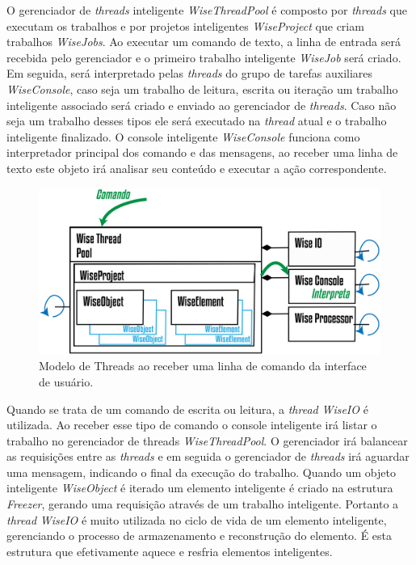 O gerenciador de \textit{threads} inteligente \textit{WiseThreadPool} é composto por \textit{threads} que executam os trabalhos e por projetos inteligentes \textit{WiseProject} que criam trabalhos \textit{WiseJobs}. Ao executar um comando de texto, a linha de entrada será recebida pelo gerenciador e o primeiro trabalho inteligente \textit{WiseJob} será criado. Em seguida, será interpretado pelas \textit{threads} do grupo de tarefas auxiliares \textit{WiseConsole}, caso seja um trabalho de leitura, escrita ou iteração um trabalho inteligente associado será criado e enviado ao gerenciador de \textit{threads}. Caso não seja um trabalho desses tipos ele será executado na \textit{thread} atual e o trabalho inteligente finalizado. O console inteligente \textit{WiseConsole} funciona como interpretador principal dos comando e das mensagens, ao receber uma linha de texto este objeto irá analisar seu conteúdo e executar a ação correspondente.

\begin{figure}[!htbp]
	\centering
	\includegraphics[width=\linewidth]{Figures/WiseThreaPoolCMD@16x.png}
	\caption{Modelo de Threads ao receber uma linha de comando da interface de usuário.}
	\label{fig8:threads}
\end{figure}

Quando se trata de um comando de escrita ou leitura, a \textit{thread} \textit{WiseIO} é utilizada. Ao receber esse tipo de comando o console inteligente irá listar o trabalho no gerenciador de threads \textit{WiseThreadPool}. O gerenciador irá balancear as requisições entre as \textit{threads} e em seguida o gerenciador de \textit{threads} irá aguardar uma mensagem, indicando o final da execução do trabalho. Quando um objeto inteligente \textit{WiseObject} é iterado um elemento inteligente é criado na estrutura \textit{Freezer}, gerando uma requisição através de um trabalho inteligente. Portanto a \textit{thread} \textit{WiseIO} é muito utilizada no ciclo de vida de um elemento inteligente, gerenciando o processo de armazenamento e reconstrução do elemento. É esta estrutura que efetivamente aquece e resfria elementos inteligentes.

